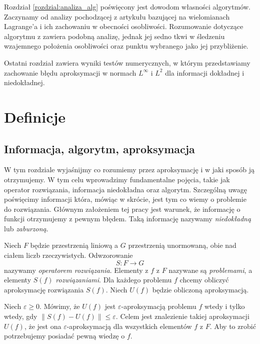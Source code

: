 \documentclass[oik, pdftex, man]{mgrwms}
\begin{document}
\begin{wstep}[Wprowadzenie]
    Rozdział \ref{rozdzial:analiza_alg} poświęcony jest dowodom własności algorytmów. Zaczynamy od analizy pochodzącej z artykułu \cite{CoDF} bazującej na wielomianach Lagrange'a i ich zachowaniu w obecności osobliwości. Rozumowanie dotyczące algorytmu z \cite{AoP} zawiera podobną analizę, jednak jej sedno tkwi w śledzeniu wzajemnego położenia osobliwości oraz punktu wybranego jako jej przybliżenie.

    Ostatni rozdział zawiera wyniki testów numerycznych, w którym przedstawiamy zachowanie błędu aproksymacji w normach $L^{\infty}$ i $L^{2}$ dla informacji dokładnej i niedokładnej.

\end{wstep}


\chapter{Definicje}


\section{Informacja, algorytm, aproksymacja}


    W tym rozdziale wyjaśnijmy co rozumiemy przez aproksymację i w jaki sposób ją otrzymujemy. W tym celu wprowadzimy fundamentalne pojęcia, takie jak operator rozwiązania, informacja niedokładna oraz algorytm. Szczególną uwagę poświęcimy informacji która, mówiąc w skrócie, jest tym co wiemy o problemie do rozwiązania. Głównym założeniem tej pracy jest warunek, że informację o funkcji otrzymujemy z pewnym błędem. Taką informację nazywamy \textit{niedokładną} lub \textit{zaburzoną}.

    Niech $F$ będzie przestrzenią liniową a $G$ przestrzenią unormowaną, obie nad ciałem liczb rzeczywistych. Odwzorowanie 
    \begin{equation*}
        S : F \rightarrow G
    \end{equation*}
    nazywamy \textit{operatorem rozwiązania}. Elementy z $f$ z $F$ nazywane są \textit{problemami}, a elementy $S(f)$ \textit{rozwiązaniami}. Dla każdego problemu $f$ chcemy obliczyć aproksymację rozwiązania $S(f)$. Niech $U(f)$ będzie obliczoną aproksymacją.

    Niech $\varepsilon \geq 0$. Mówimy, że $U(f)$ jest $\varepsilon$-aproksymacją problemu $f$ wtedy i tylko wtedy, gdy $\| S(f) -  U(f)\| \leq \varepsilon$. Celem jest znalezienie takiej aproksymacji $U(f)$, że jest ona $\varepsilon$-aproksymacją dla wszystkich elementów $f$ z $F$. Aby to zrobić potrzebujemy posiadać pewną wiedzę o $f$.
\end{document}
